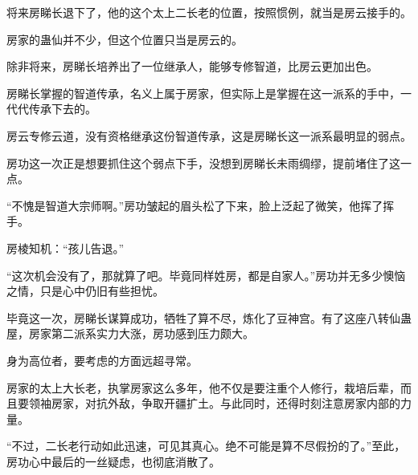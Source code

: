 \begin{this_body}
将来房睇长退下了，他的这个太上二长老的位置，按照惯例，就当是房云接手的。

房家的蛊仙并不少，但这个位置只当是房云的。

除非将来，房睇长培养出了一位继承人，能够专修智道，比房云更加出色。

房睇长掌握的智道传承，名义上属于房家，但实际上是掌握在这一派系的手中，一代代传承下去的。

房云专修云道，没有资格继承这份智道传承，这是房睇长这一派系最明显的弱点。

房功这一次正是想要抓住这个弱点下手，没想到房睇长未雨绸缪，提前堵住了这一点。

“不愧是智道大宗师啊。”房功皱起的眉头松了下来，脸上泛起了微笑，他挥了挥手。

房棱知机：“孩儿告退。”

“这次机会没有了，那就算了吧。毕竟同样姓房，都是自家人。”房功并无多少懊恼之情，只是心中仍旧有些担忧。

毕竟这一次，房睇长谋算成功，牺牲了算不尽，炼化了豆神宫。有了这座八转仙蛊屋，房家第二派系实力大涨，房功感到压力颇大。

身为高位者，要考虑的方面远超寻常。

房家的太上大长老，执掌房家这么多年，他不仅是要注重个人修行，栽培后辈，而且要领袖房家，对抗外敌，争取开疆扩土。与此同时，还得时刻注意房家内部的力量。

“不过，二长老行动如此迅速，可见其真心。绝不可能是算不尽假扮的了。”至此，房功心中最后的一丝疑虑，也彻底消散了。

\end{this_body}

